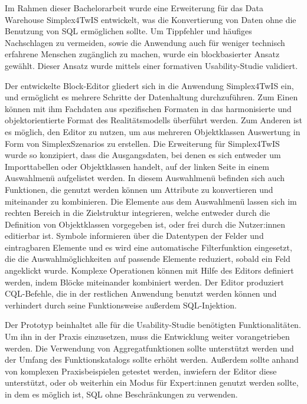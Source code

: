 Im Rahmen dieser Bachelorarbeit wurde eine Erweiterung für das Data Warehouse Simplex4TwIS entwickelt, was die Konvertierung von Daten ohne die Benutzung von \acs{SQL} ermöglichen sollte. Um Tippfehler und häufiges Nachschlagen zu vermeiden, sowie die Anwendung auch für weniger technisch erfahrene Menschen zugänglich zu machen, wurde ein blockbasierter Ansatz gewählt. Dieser Ansatz wurde mittels einer formativen Usability-Studie validiert.

\pskip
Der entwickelte Block-Editor gliedert sich in die Anwendung Simplex4TwIS ein, und ermöglicht es mehrere Schritte der Datenhaltung durchzuführen. Zum Einen können mit ihm Fachdaten aus spezifischen Formaten in das harmonisierte und objektorientierte Format des Realitätsmodells überführt werden. Zum Anderen ist es möglich, den Editor zu nutzen, um aus mehreren Objektklassen Auswertung in Form von SimplexSzenarios zu erstellen. Die Erweiterung für Simplex4TwIS wurde so konzipiert, dass die Ausgangsdaten, bei denen es sich entweder um Importtabellen oder Objektklassen handelt, auf der linken Seite in einem Auswahlmenü aufgelistet werden. In diesem Auswahlmenü befinden sich auch Funktionen, die genutzt werden können um Attribute zu konvertieren und miteinander zu kombinieren. Die Elemente aus dem Auswahlmenü lassen sich im rechten Bereich in die Zielstruktur integrieren, welche entweder durch die Definition von Objektklassen vorgegeben ist, oder frei durch die Nutzer:innen editierbar ist. Symbole informieren über die Datentypen der Felder und eintragbaren Elemente und es wird eine automatische Filterfunktion eingesetzt, die die Auswahlmöglichkeiten auf passende Elemente reduziert, sobald ein Feld angeklickt wurde. Komplexe Operationen können mit Hilfe des Editors definiert werden, indem Blöcke miteinander kombiniert werden. Der Editor produziert \ac{CQL}-Befehle, die in der restlichen Anwendung benutzt werden können und verhindert durch seine Funktionsweise außerdem \ac{SQL}-Injektion.

Der Prototyp beinhaltet alle für die Usability-Studie benötigten Funktionalitäten. Um ihn in der Praxis einzusetzen, muss die Entwicklung weiter vorangetrieben werden. Die Verwendung von Aggregatfunktionen sollte unterstützt werden und der Umfang des Funktionskatalogs sollte erhöht werden. Außerdem sollte anhand von komplexen Praxisbeispielen getestet werden, inwiefern der Editor diese unterstützt, oder ob weiterhin ein Modus für Expert:innen genutzt werden sollte, in dem es möglich ist, \ac{SQL} ohne Beschränkungen zu verwenden.

